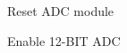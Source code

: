 \begin{DoxyItemize}
\item Reset A\+DC module ~\newline
~\newline
~\newline
~\newline
~\newline
~\newline
~\newline
~\newline
~\newline
~\newline
~\newline
~\newline
~\newline
~\newline
~\newline
~\newline
~\newline
~\newline
~\newline
~\newline
~\newline
~\newline
~\newline

\item Enable 12-\/\+B\+IT A\+DC ~\newline
~\newline
~\newline
~\newline
~\newline
~\newline
~\newline
~\newline
~\newline
~\newline
~\newline
~\newline
~\newline
~\newline
~\newline
~\newline
~\newline
~\newline
~\newline
~\newline
~\newline
~\newline


\end{DoxyItemize}
